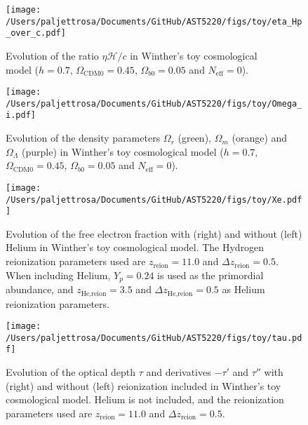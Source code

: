 \documentclass{aa}
\numberwithin{equation}{section}
\numberwithin{table}{section}
\numberwithin{figure}{section}
\begin{document}
\begin{figure}[h!]
  \begin{minipage}{0.5\textwidth}
    \centering
    \texttt{[image: /Users/paljettrosa/Documents/GitHub/AST5220/figs/toy/eta\_Hp\_over\_c.pdf]}
    \caption{Evolution of the ratio $\eta\mathcal{H}/c$ in Winther's toy cosmological\\ model ($h=0.7$, $\Omega_{\text{CDM}0}=0.45$, $\Omega_{b0}=0.05$ and $N_\text{eff}=0$).}\label{appfig: eta_Hp_over_c}
  \end{minipage}
  \begin{minipage}{0.5\textwidth}
    \texttt{[image: /Users/paljettrosa/Documents/GitHub/AST5220/figs/toy/Omega\_i.pdf]}
    \caption{Evolution of the density parameters $\Omega_r$ (green), $\Omega_m$ (orange) and $\Omega_\Lambda$ (purple) in Winther's toy cosmological model ($h=0.7$, $\Omega_{\text{CDM}0}=0.45$, $\Omega_{b0}=0.05$ and $N_\text{eff}=0$).}\label{appfig: Omega_i}
  \end{minipage}
\vspace{-5pt}
\end{figure}


\begin{figure}[h!]
  \centering
  \texttt{[image: /Users/paljettrosa/Documents/GitHub/AST5220/figs/toy/Xe.pdf]}
  \caption{Evolution of the free electron fraction with (right) and without (left) Helium in Winther's toy cosmological model. The Hydrogen reionization parameters used are $z_\text{reion}=11.0$ and $\Delta z_\text{reion}=0.5$. When including Helium, $Y_p=0.24$ is used as the primordial abundance, and $z_\text{He,reion}=3.5$ and $\Delta z_\text{He,reion}=0.5$ as Helium reionization parameters.}\label{appfig: Xe}
  \vspace{-20pt}
\end{figure}

\newpage

\begin{figure}[h!]
  \centering
  \texttt{[image: /Users/paljettrosa/Documents/GitHub/AST5220/figs/toy/tau.pdf]}
  \caption{Evolution of the optical depth $\tau$ and derivatives $-\tau'$ and $\tau''$ with (right) and without (left) reionization included in Winther's toy cosmological model. Helium is not included, and the reionization parameters used are $z_\text{reion}=11.0$ and $\Delta z_\text{reion}=0.5$.}\label{appfig: tau}
  \vspace{-10pt}
\end{figure}
\end{document}
